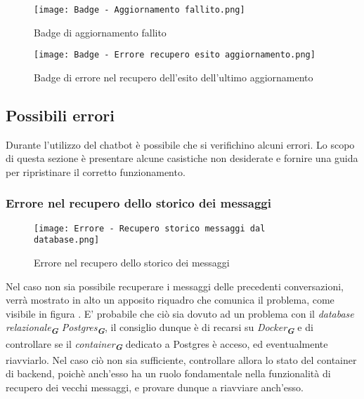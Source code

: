 \begin{figure}[h]
    \centering
        \texttt{[image: Badge - Aggiornamento fallito.png]}
        \caption{Badge di aggiornamento fallito}
        \label{fig:Aggiornamento fallito}
\end{figure}

\begin{figure}[h]
    \centering
        \texttt{[image: Badge - Errore recupero esito aggiornamento.png]}
        \caption{Badge di errore nel recupero dell'esito dell'ultimo aggiornamento}
        \label{fig:Errore nel recupero dell'esito dell'ultimo aggiornamento}
\end{figure}



\newpage

\subsection{Possibili errori}
\label{subsec:possibili_errori}

Durante l'utilizzo del chatbot è possibile che si verifichino alcuni errori. Lo scopo di questa sezione è presentare alcune casistiche non desiderate e fornire una guida per ripristinare il corretto funzionamento.


\subsubsection{Errore nel recupero dello storico dei messaggi}

\begin{figure}[h]
    \centering
        \texttt{[image: Errore - Recupero storico messaggi dal database.png]}
        \caption{Errore nel recupero dello storico dei messaggi}
        \label{fig:Errore nel recupero dello storico dei messaggi}
\end{figure}

Nel caso non sia possibile recuperare i messaggi delle precedenti conversazioni, verrà mostrato in alto un apposito riquadro che comunica il problema, come visibile in figura . E' probabile che ciò sia dovuto ad un problema con il \emph{database relazionale}\textsubscript{\textbf{\textit{G}}} \emph{Postgres}\textsubscript{\textbf{\textit{G}}}, il consiglio dunque è di recarsi su \emph{Docker}\textsubscript{\textbf{\textit{G}}} e di controllare se il \emph{container}\textsubscript{\textbf{\textit{G}}} dedicato a Postgres è acceso, ed eventualmente riavviarlo. Nel caso ciò non sia sufficiente, controllare allora lo stato del container di backend, poichè anch'esso ha un ruolo fondamentale nella funzionalità di recupero dei vecchi messaggi, e provare dunque a riavviare anch'esso.


